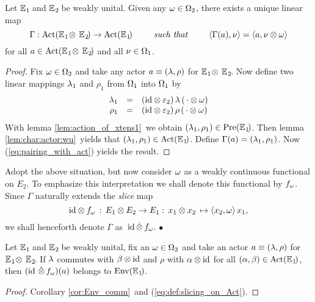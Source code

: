 \begin{prop_sec} \label{prop:slicing_on_Act}
Let\/ $\mathbb{E}_{\hspace{0.5pt}1}\!$ and\/ $\mathbb{E}_{\hspace{0.5pt}2}\!$ be weakly unital.
Given any\/ $\omega \in \Omega_2$, there exists a unique linear map\/
$$\Gamma : \mbox{\rm Act}(\mathbb{E}_{\hspace{0.5pt}1}\! \otimes\, \mathbb{E}_{\hspace{0.5pt}2}\!)  \rightarrow  \mbox{\rm Act}(\mathbb{E}_{\hspace{0.5pt}1}\!)
       \hspace{2.5em} \mbox{\it such that}  \hspace{2.5em}
  \langle \Gamma(a),\nu \rangle = \langle a,\nu \otimes \omega \rangle $$
for all\/ $a\in \mbox{\rm Act}(\mathbb{E}_{\hspace{0.5pt}1}\! \otimes\, \mathbb{E}_{\hspace{0.5pt}2}\!)$ and all\/ $\nu \in \Omega_1$.
\end{prop_sec}
\begin{proof}
Fix $\omega \in \Omega_2$ and take any actor $a \equiv (\lambda,\rho)$ for $\mathbb{E}_{\hspace{0.5pt}1}\! \otimes\, \mathbb{E}_{\hspace{0.5pt}2}\!$.
Now define two linear mappings $\lambda_1$ and $\rho_1$ from $\Omega_1$ into $\Omega_1$ by
\begin{equation} \label{eq:def:slicing_on_Act}
\begin{array}{rcl}
    \lambda_1 &=& (\mbox{\rm id} \otimes \varepsilon_2) \,\lambda\, (\,\cdot \otimes \omega) \\
    \rho_1 &=& (\mbox{\rm id} \otimes \varepsilon_2) \,\rho\, (\,\cdot \otimes \omega)
  \end{array}
\end{equation}
With lemma \ref{lem:action_of_xtens1}\ we obtain $(\lambda_1,\rho_1) \in \mbox{\rm Pre}(\mathbb{E}_{\hspace{0.5pt}1}\!)$.
Then lemma \ref{lem:char:actor:wu}\ yields that $(\lambda_1,\rho_1) \in \mbox{\rm Act}(\mathbb{E}_{\hspace{0.5pt}1}\!)$.
Define $\Gamma(a)=(\lambda_1,\rho_1)$. Now (\ref{eq:pairing_with_act}) yields the result.
\end{proof}


\begin{notation_sec} \label{not:slicing_on_Act}  \rm
Adopt the above situation, but now consider $\omega$ as a weakly continuous functional on $E_2$.
To emphasize this interpretation we shall denote this functional by $f_\omega$.
Since $\Gamma$ naturally extends the {\em slice\/} map
$$ \mbox{\rm id} \otimes f_\omega  \,:\,  E_1 \otimes E_2 \rightarrow E_1
                   :\,  x_1 \otimes x_2 \, \mapsto  \langle x_2,\omega \rangle\, x_1, $$
we shall henceforth denote $\Gamma$ as $\,\mbox{\rm id} \,\hat{\otimes}\, f_\omega$.
\hfill $\bullet$
\end{notation_sec}



\begin{prop_sec} \label{prop:slices_in_Env}
Let\/ $\mathbb{E}_{\hspace{0.5pt}1}\!$ and\/ $\mathbb{E}_{\hspace{0.5pt}2}\!$ be weakly unital, fix an\/ $\omega \in \Omega_2$ and
take an actor\/ $a \equiv (\lambda,\rho)$ for\/ $\mathbb{E}_{\hspace{0.5pt}1}\! \otimes\, \mathbb{E}_{\hspace{0.5pt}2}\!$.
If\/ $\lambda$ commutes with\/ $\beta \otimes \mbox{\rm id}$ and\/ $\rho$ with\/ $\alpha \otimes \mbox{\rm id}$
for all\/ $(\alpha, \beta) \in \mbox{\rm Act}(\mathbb{E}_{\hspace{0.5pt}1}\!)$,
then\/ $(\mbox{\rm id}\, \,\hat{\otimes}\, f_\omega)(a)$ belongs to\/ $\mbox{\rm Env}(\mathbb{E}_{\hspace{0.5pt}1}\!)$.
\end{prop_sec}
\begin{proof}
Corollary \ref{cor:Env_comm}\ and (\ref{eq:def:slicing_on_Act}).
\end{proof}



